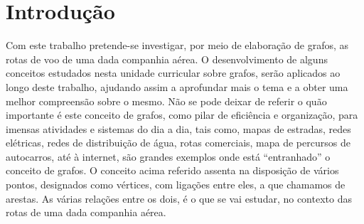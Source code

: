 \chapter{Introdução}
Com este trabalho pretende-se investigar, por meio de elaboração de grafos, as rotas de voo de uma dada 
companhia aérea. O desenvolvimento de alguns conceitos estudados nesta unidade curricular sobre grafos, 
serão aplicados ao longo deste trabalho, ajudando assim a aprofundar mais o tema e a obter uma melhor 
compreensão sobre o mesmo.
Não se pode deixar de referir o quão importante é este conceito de grafos, como pilar de eficiência e 
organização, para imensas atividades e sistemas do dia a dia, tais como, mapas de estradas, redes elétricas, 
redes de distribuição de água, rotas comerciais, mapa de percursos de autocarros, até à internet, são grandes 
exemplos onde está “entranhado” o conceito de grafos.
O conceito acima referido assenta na disposição de vários pontos, designados como vértices, com ligações 
entre eles, a que chamamos de arestas. As várias relações entre os dois, é o que se vai estudar, no contexto das 
rotas de uma dada companhia aérea.